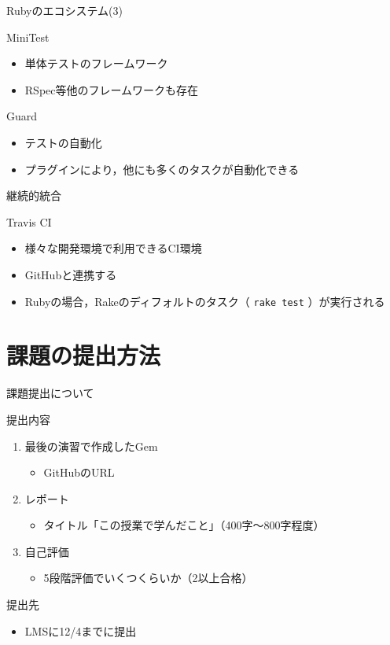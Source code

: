 \documentclass[t, aspectratio=169]{beamer}
\begin{document}
\begin{frame}[label=sec-8-1-3]{Rubyのエコシステム(3)}
\begin{block}{MiniTest}
\begin{itemize}
\item 単体テストのフレームワーク
\item RSpec等他のフレームワークも存在
\end{itemize}
\end{block}
\begin{block}{Guard}
\begin{itemize}
\item テストの自動化
\item プラグインにより，他にも多くのタスクが自動化できる
\end{itemize}
\end{block}
\end{frame}

\begin{frame}[fragile,label=sec-8-1-4]{継続的統合}
 \begin{block}{Travis CI}
\begin{itemize}
\item 様々な開発環境で利用できるCI環境
\item GitHubと連携する
\item Rubyの場合，Rakeのディフォルトのタスク（ \texttt{rake test} ）が実行される
\end{itemize}
\end{block}
\end{frame}

\section{課題の提出方法}
\label{sec-8-2}
\begin{frame}[label=sec-8-2-1]{課題提出について}
\begin{block}{提出内容}
\begin{enumerate}
\item 最後の演習で作成したGem
\begin{itemize}
\item GitHubのURL
\end{itemize}
\item レポート
\begin{itemize}
\item タイトル「この授業で学んだこと」（400字〜800字程度）
\end{itemize}
\item 自己評価
\begin{itemize}
\item 5段階評価でいくつくらいか（2以上合格）
\end{itemize}
\end{enumerate}
\end{block}
\begin{block}{提出先}
\begin{itemize}
\item LMSに12/4までに提出
\end{itemize}
\end{block}
\end{frame}
\end{document}
